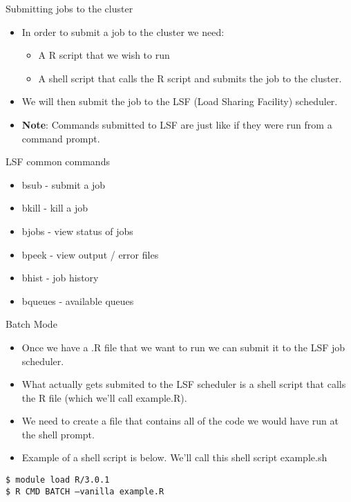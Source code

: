 \begin{frame}{Submitting jobs to the cluster}
\begin{itemize}
\item In order to submit a job to the cluster we need: 
\begin{itemize}
\item A R script that we wish to run
\item A shell script that calls the R script and submits the job to the cluster.  
\end{itemize}
\item We will then submit the job to the LSF (Load Sharing Facility) scheduler.  
\item {\bf Note}: Commands submitted to LSF are just like if they were run from a command prompt. 
\end{itemize}
\end{frame}


\begin{frame}{LSF common commands}
\begin{itemize}
\item bsub - submit a job
\item bkill - kill a job
\item bjobs - view status of jobs
\item bpeek - view output / error files
\item bhist - job history
\item bqueues - available queues
\end{itemize}
\end{frame}







\begin{frame}{Batch Mode}
\begin{itemize}
\item Once we have a .R file that we want to run we can submit it to the LSF job scheduler.  
\item What actually gets submited to the LSF scheduler is a shell script that calls the R file (which we'll call example.R). 
\item We need to create a file that contains all of the code we would have run at the shell prompt.  
\item Example of a shell script is below. We'll call this shell script example.sh
\end{itemize}
{\tt \$ module load R/3.0.1 }\\
{\tt \$ R CMD BATCH --vanilla example.R}\\
\end{frame}

